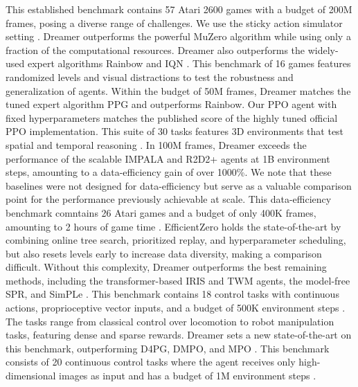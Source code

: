 \begin{itemize}
 This established benchmark contains 57 Atari 2600 games with a budget of 200M frames, posing a diverse range of challenges\citep{bellemare2013ale}.
We use the sticky action simulator setting \citep{machado2018revisiting}.
Dreamer outperforms the powerful MuZero algorithm\citep{schrittwieser2019muzero} while using only a fraction of the computational resources.
Dreamer also outperforms the widely-used expert algorithms Rainbow \citep{hessel2018rainbow} and IQN \citep{dabney2018iqn}.
 This benchmark of 16 games features randomized levels and visual distractions to test the robustness and generalization of agents\citep{cobbe2020procgen}. Within the budget of 50M frames, Dreamer matches the tuned expert algorithm PPG \citep{cobbe2021ppg} and outperforms Rainbow\citep{cobbe2020procgen,hessel2018rainbow}. Our PPO agent with fixed hyperparameters matches the published score of the highly tuned official PPO implementation\citep{cobbe2021ppg}.
 This suite of 30 tasks features 3D environments that test spatial and temporal reasoning \citep{beattie2016dmlab}. In 100M frames, Dreamer exceeds the performance of the scalable IMPALA and R2D2+ agents \citep{kapturowski2018r2d2} at 1B environment steps, amounting to a data-efficiency gain of over 1000\%.
We note that these baselines were not designed for data-efficiency but serve as a valuable comparison point for the performance previously achievable at scale.
 This data-efficiency benchmark comntains 26 Atari games and a budget of only 400K frames, amounting to 2 hours of game time \citep{kaiser2019simple}. EfficientZero \citep{ye2021effzero} holds the state-of-the-art by combining online tree search, prioritized replay, and hyperparameter scheduling, but also resets levels early to increase data diversity, making a comparison difficult.
Without this complexity, Dreamer outperforms the best remaining methods, including the transformer-based IRIS and TWM agents, the model-free SPR, and SimPLe \citep{micheli2022iris}.
 This benchmark contains 18 control tasks with continuous actions, proprioceptive vector inputs, and a budget of 500K environment steps \citep{tassa2018dmcontrol}. The tasks range from classical control over locomotion to robot manipulation tasks, featuring dense and sparse rewards. Dreamer sets a new state-of-the-art on this benchmark,
outperforming D4PG, DMPO, and MPO \citep{abdolmaleki2018mpo}.
 This benchmark consists of 20 continuous control tasks where the agent receives only high-dimensional images as input and has a budget of 1M environment steps \citep{tassa2018dmcontrol}.

\end{itemize}
